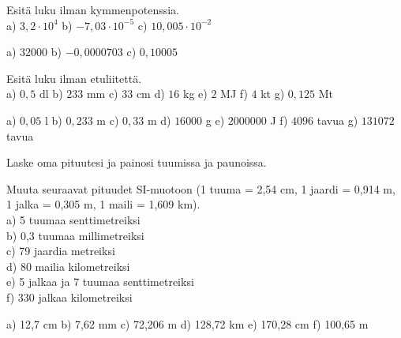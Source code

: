 
\begin{tehtava}
Esitä luku ilman kymmenpotenssia. \\
a) $3,2 \cdot 10^4$ \qquad
b) $-7,03 \cdot 10^{-5}$ \qquad
c) $10,005 \cdot 10^{-2}$ \qquad
\begin{vastaus}
a) $32000$ \qquad
b) $-0,0000703$ \qquad
c) $0,10005$ \qquad
\end{vastaus}
\end{tehtava}


\begin{tehtava}
Esitä luku ilman etuliitettä. \\
a) $0,5$ dl \qquad
b) $233$ mm \qquad
c) $33$ cm \qquad
d) $16$ kg \qquad
e) $2$ MJ \qquad
f) $4$ kt \qquad
g) $0,125$ Mt
\begin{vastaus}
a) $0,05$ l \qquad
b) $0,233$ m \qquad
c) $0,33$ m \qquad
d) $16 000$ g \qquad
e) $2 000 000$ J \qquad
f) $4096$ tavua \qquad
g) $131072$ tavua
\end{vastaus}
\end{tehtava}

\begin{tehtava}
Laske oma pituutesi ja painosi tuumissa ja paunoissa.
\end{tehtava}

\begin{tehtava}
Muuta seuraavat pituudet SI-muotoon (1 tuuma = 2,54 cm, 1 jaardi = 0,914 m, 1 jalka = 0,305 m, 1 maili = 1,609 km). \\
a) 5 tuumaa senttimetreiksi \\
b) 0,3 tuumaa millimetreiksi \\
c) 79 jaardia metreiksi \\
d) 80 mailia kilometreiksi \\
e) 5 jalkaa ja 7 tuumaa senttimetreiksi \\
f) 330 jalkaa kilometreiksi
\begin{vastaus}
a) 12,7 cm \qquad
b) 7,62 mm \qquad
c) 72,206 m \qquad
d) 128,72 km \qquad
e) 170,28 cm \qquad
f) 100,65 m
\end{vastaus}
\end{tehtava}


